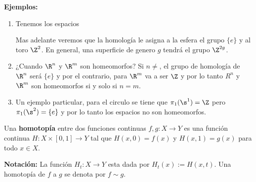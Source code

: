 \documentclass{article}
\begin{document}
\noindent\textbf{Ejemplos:}
\begin{enumerate}
    \item Tenemos los espacios
    \begin{center} %
        \hspace{2cm}
    \end{center}
    Mas adelante veremos que la homología le asigna a la esfera el grupo $\{e\}$ y al toro 
    $\Z^{2}$. En general, una superficie de genero $g$ tendrá el grupo $\Z^{2g}$.

    \item ¿Cuando $\R^{n}$ y $\R^{m}$ son homeomorfos? Si $n\neq$, el grupo de homología de 
    $\R^{n}$ será $\{e\}$ y por el contrario, para $\R^{m}$ va a ser $\Z$ y por lo tanto $R^{n}$ y
    $\R^{m}$ son homeomorfos si y solo si $n=m$.

    \item Un ejemplo particular, para el circulo se tiene que $\pi_{1}(\s^{1})=\Z$ pero 
    $\pi_{1}(\s^{2})=\{e\}$ y por lo tanto los espacios no son homeomorfos.
\end{enumerate}

\vspace{2mm}
\begin{dfn}
    Una \textbf{homotopía} entre dos funciones continuas $f,g:X\to Y$ es una función continua 
    $H:X\times[0,1]\to Y$ tal que $H(x,0)=f(x)$ y $H(x,1)=g(x)$ para todo $x\in X$.
\end{dfn}
\noindent\textbf{Notación:} La función $H_{t}:X\to Y$ esta dada por $H_{t}(x):=H(x,t)$. Una 
homotopía de $f$ a $g$ se denota por $f\sim g$.
\end{document}
